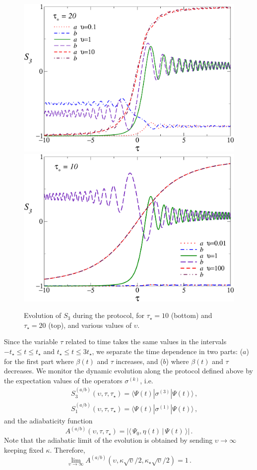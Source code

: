 \begin{figure}[!htb]
  \centering
  \includegraphics[width=0.55\columnwidth]{imm/mag3taus20.pdf}
      \includegraphics[width=0.55\columnwidth]{imm/mag3taus10.pdf}
  \caption{Evolution of $S_3$ during the protocol, for $\tau_\star=10$
    (bottom) and $\tau_\star=20$ (top), and various values of
    $\upsilon$.}
  \label{lzfigs1}
\end{figure}







Since the variable $\tau$ related to time takes the same values in the
intervals $-t_\star\le t\le t_\star$ and $t_\star\le t\le 3 t_\star$,
we separate  the time dependence in two parts: ($a$) for the first
part where $\beta(t)$ and $\tau$ increases, and ($b$) where $\beta(t)$
and $\tau$ decreases. 
We monitor the dynamic evolution along the protocol defined above by
the expectation values of the operators $\sigma^{(k)}$, i.e.
\begin{eqnarray}
  && S_{3}^{(a/b)}(\upsilon,\tau,\tau_\star) = \langle \Psi(t) |
  \sigma^{(3)} | \Psi(t) \rangle \,,\label{s3def}\\ &&
  S_1^{(a/b)}(\upsilon,\tau,\tau_\star) = \langle \Psi(t) | \sigma^{(1)} |
  \Psi(t) \rangle \,,\label{s1def}
\end{eqnarray}
and the adiabaticity function
\begin{equation}
  A^{(a/b)}(\upsilon,\tau,\tau_\star)
  = |\langle \, \Psi_0, \eta(t) \, | \,
    \Psi(t) \, \rangle|\,.
    \label{addef}
\end{equation}
Note that the adiabatic limit of the evolution
is obtained by sending $\upsilon\to\infty$ keeping fixed
$\kappa$. Therefore,
\begin{equation}
  \lim_{\upsilon\to\infty} A^{(a/b)}(\upsilon, \kappa
  \sqrt{\upsilon}/2, \kappa_\star \sqrt{\upsilon}/2) = 1\,.
  \label{adiablimit}
\end{equation}

